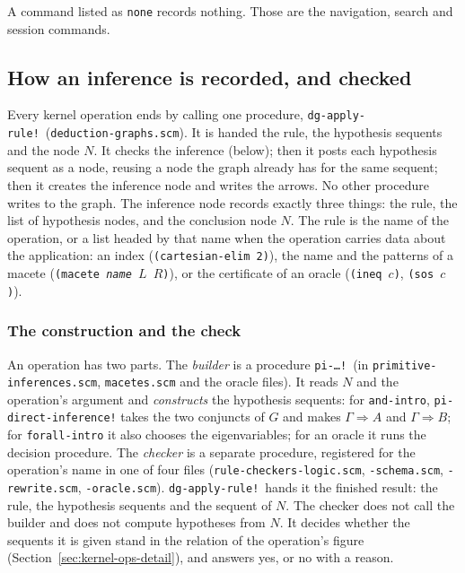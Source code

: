 A command listed as \texttt{none} records nothing.  Those are the
navigation, search and session commands.


\VNBtacticusestable

\subsection{How an inference is recorded, and checked}\label{sec:inference-checked}

Every kernel operation ends by calling one procedure,
\texttt{dg-apply-rule!}\ (\texttt{deduction-graphs.scm}).  It is handed
the rule, the hypothesis sequents and the node $N$.  It checks the
inference (below); then it posts each hypothesis sequent as a node,
reusing a node the graph already has for the same sequent; then it
creates the inference node and writes the arrows.  No other procedure
writes to the graph.
The inference node records exactly three things: the rule, the list of
hypothesis nodes, and the conclusion node $N$.  The rule is the name of
the operation, or a list headed by that name when the operation carries
data about the application: an index (\texttt{(cartesian-elim 2)}), the
name and the patterns of a macete (\texttt{(macete \textit{name} $L$
$R$)}), or the certificate of an oracle (\texttt{(ineq $c$)},
\texttt{(sos $c$)}).

\subsubsection*{The construction and the check}

An operation has two parts.  The \emph{builder} is a procedure
\texttt{pi-\ldots!}\ (in \texttt{primitive-inferences.scm},
\texttt{macetes.scm} and the oracle files).  It reads $N$ and the
operation's argument and \emph{constructs} the hypothesis sequents: for
\texttt{and-intro}, \texttt{pi-direct-inference!} takes the two conjuncts
of $G$ and makes $\Gamma \Longrightarrow A$ and
$\Gamma \Longrightarrow B$; for \texttt{forall-intro} it also chooses the
eigenvariables; for an oracle it runs the decision procedure.  The
\emph{checker} is a separate procedure, registered for the operation's
name in one of four files (\texttt{rule-checkers-logic.scm},
\texttt{-schema.scm}, \texttt{-rewrite.scm}, \texttt{-oracle.scm}).
\texttt{dg-apply-rule!}\ hands it the finished result: the rule, the
hypothesis sequents and the sequent of $N$.  The checker does not call
the builder and does not compute hypotheses from $N$.  It decides whether
the sequents it is given stand in the relation of the operation's figure
(Section~\ref{sec:kernel-ops-detail}), and answers yes, or no with a
reason.

